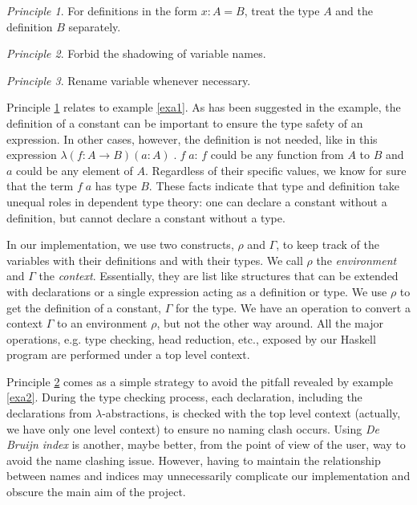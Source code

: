 \documentclass{article}
\theoremstyle{remark}
\newtheorem{principle}{Principle}
\begin{document}
\begin{principle} \label{p1}
  For definitions in the form $x : A = B$, treat the type $A$ and the definition $B$ separately.
\end{principle}

\begin{principle} \label{p2}
  Forbid the shadowing of variable names.
\end{principle}

\begin{principle} \label{p3}
  Rename variable whenever necessary. 
\end{principle}

Principle \ref{p1} relates to example \ref{exa1}. As has been suggested in the example, the definition of a constant can be important to ensure the type safety of an expression. In other cases, however, the definition is not needed, like in this expression $\lambda (f : A \to B) (a : A) \; . \; f \; a$: $f$ could be any function from $A$ to $B$ and $a$ could be any element of $A$. Regardless of their specific values, we know for sure that the term $f \; a$ has type $B$. These facts indicate that type and definition take unequal roles in dependent type theory: one can declare a constant without a definition, but cannot declare a constant without a type.

In our implementation, we use two constructs, $\rho$ and $\Gamma$, to keep track of the variables with their definitions and with their types. We call $\rho$ the \emph{environment} and $\Gamma$ the \emph{context}. Essentially, they are list like structures that can be extended with declarations or a single expression acting as a definition or type. We use $\rho$ to get the definition of a constant, $\Gamma$ for the type. We have an operation to convert a context $\Gamma$ to an environment $\rho$, but not the other way around. All the major operations, e.g. type checking, head reduction, etc., exposed by our Haskell program are performed under a top level context.

Principle \ref{p2} comes as a simple strategy to avoid the pitfall revealed by example \ref{exa2}. During the type checking process, each declaration, including the declarations from $\lambda$-abstractions, is checked with the top level context (actually, we have only one level context) to ensure no naming clash occurs. Using \emph{De Bruijn index} is another, maybe better, from the point of view of the user, way to avoid the name clashing issue. However, having to maintain the relationship between names and indices may unnecessarily complicate our implementation and obscure the main aim of the project. 
\end{document}
